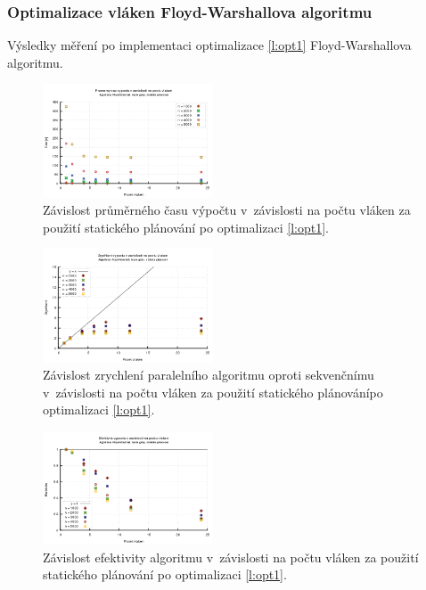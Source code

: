 \subsubsection{Optimalizace vláken Floyd-Warshallova algoritmu} \label{l:mer:opt1}
Výsledky měření po implementaci optimalizace \ref{l:opt1} Floyd-Warshallova algoritmu.

\begin{figure}
    \centering
    \includegraphics[width=0.45\textwidth]{../grafy/02_openMP/02-01-Floyd_cas_v2}
    \caption{Závislost průměrného času výpočtu v~závislosti na počtu vláken za použití statického plánování po optimalizaci \ref{l:opt1}.}
    \label{f:mer:cas:opt1}
\end{figure}

\begin{figure}
    \centering
    \includegraphics[width=0.45\textwidth]{../grafy/02_openMP/02-02-Floyd_zrychleni_v2}
    \caption{Závislost zrychlení paralelního algoritmu oproti sekvenčnímu v~závislosti na počtu vláken za použití statického plánovánípo optimalizaci \ref{l:opt1}.}
    \label{f:mer:zry:opt1}
\end{figure}

\begin{figure}
    \centering
    \includegraphics[width=0.45\textwidth]{../grafy/02_openMP/02-03-Floyd_efektivita_v2}
    \caption{Závislost efektivity algoritmu v~závislosti na počtu vláken za použití statického plánování po optimalizaci \ref{l:opt1}.}
    \label{f:mer:efe:opt1}
\end{figure}

